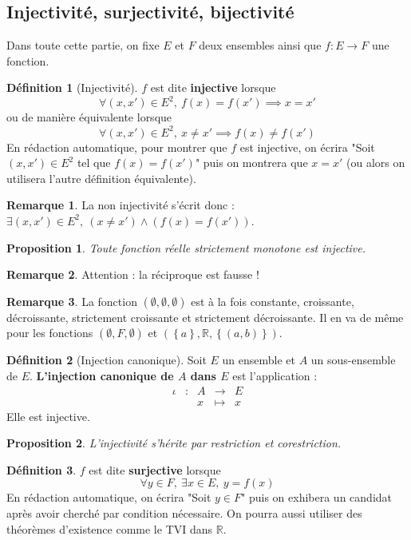 \documentclass[french]{book}
\newcommand{\R}{\mathbb{R}}
\theoremstyle{plain}
\newtheorem{prop}{Proposition}[chapter]
\theoremstyle{definition}
\newtheorem{dfn}{Définition}[chapter]
\newtheorem{rmq}{Remarque}[chapter]
\theoremstyle{remark}
\begin{document}
\subsection{Injectivité, surjectivité, bijectivité}
Dans toute cette partie, on fixe $E$ et $F$ deux ensembles ainsi que $f:E\rightarrow F$ une fonction.
\begin{dfn}[Injectivité]
	$f$ est dite \textbf{injective} lorsque $$\forall(x,x')\in E^2,\ f(x)=f(x')\implies x=x'$$ ou de manière équivalente lorsque $$\forall (x,x')\in E^2,\ x\ne x'\implies f(x)\ne f(x')$$ En rédaction automatique, pour montrer que $f$ est injective, on écrira "Soit $(x,x')\in E^2$ tel que $f(x)=f(x')$" puis on montrera que $x=x'$ (ou alors on utilisera l'autre définition équivalente).
\end{dfn}
\begin{rmq}
	La non injectivité s'écrit donc : $\exists(x,x')\in E^2,\ (x\ne x')\land(f(x)=f(x'))$.
\end{rmq}
\begin{prop}
	Toute fonction réelle strictement monotone est injective.
\end{prop}
\begin{rmq}
	Attention : la réciproque est fausse !
\end{rmq}
\begin{rmq}
	La fonction $(\emptyset,\emptyset,\emptyset)$ est à la fois constante, croissante, décroissante, strictement croissante et strictement décroissante. Il en va de même pour les fonctions $(\emptyset,F,\emptyset)$ et $(\left\{a\right\},\R,\left\{(a,b)\right\})$.
\end{rmq}
\begin{dfn}[Injection canonique]
	Soit $E$ un ensemble et $A$ un sous-ensemble de $E$. \textbf{L'injection canonique de $A$ dans $E$} est l'application : $$\begin{array}{ccccc}\iota&:&A&\rightarrow&E\\&&x&\mapsto&x\end{array}$$ Elle est injective.
\end{dfn}
\begin{prop}
	L'injectivité s'hérite par restriction et corestriction.
\end{prop}
\begin{dfn}
	$f$ est dite \textbf{surjective} lorsque $$\forall y\in F,\ \exists x\in E,\ y=f(x)$$ En rédaction automatique, on écrira "Soit $y\in F$" puis on exhibera un candidat après avoir cherché par condition nécessaire. On pourra aussi utiliser des théorèmes d'existence comme le TVI dans $\R$.
\end{dfn}
\end{document}
